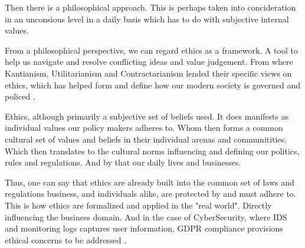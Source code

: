 Then there is a philosophical approach. This is perhaps taken into concideration in an unconsious level in a daily basis which has to do with subjective internal values.

From a philosophical perspective, we can regard ethics as a framework. A tool to help us navigate and resolve conflicting ideas and value judgement. From where Kantianism, Utilitarianism and Contractarianism lended their specific views on ethics, which has helped form and define how our modern society is governed and policed \cite{Courtland2017}.

Ethics, although primarily a subjective set of beliefs used. It does manifests as individual values our policy makers adheres to. Whom then forms a common cultural set of values and beliefs in their individual arenas and communitities. Which then translates to the cultural norms influencing and defining our politics, rules and regulations. And by that our daily lives and businesses.

Thus, one can say that ethics are already built into the common set of laws and regulations business, and individuals alike, are protected by and must adhere to. This is how ethics are formalized and applied in the "real world". Directly influencing the business domain. And in the case of CyberSecurity, where IDS and monitoring logs captures user information, GDPR compliance provisions ethical concerns to be addressed \cite{Haberkorn2019}.

